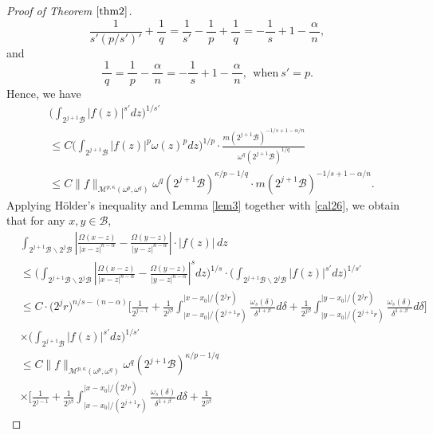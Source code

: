 \documentclass[preprint,10pt]{elsarticle}
\numberwithin{equation}{section}
\begin{document}
\begin{proof}[Proof of Theorem $\ref{thm2}$]
\begin{equation*}
\frac{1}{s'(p/{s'})'}+\frac{\,1\,}{q}=\frac{1}{s'}-\frac{\,1\,}{p}+\frac{\,1\,}{q}=-\frac{\,1\,}{s}+1-\frac{\alpha}{\,n\,},
\end{equation*}
and
\begin{equation*}
\frac{\,1\,}{q}=\frac{\,1\,}{p}-\frac{\alpha}{\,n\,}=-\frac{\,1\,}{s}+1-\frac{\alpha}{\,n\,},~~\mbox{when}~ s'=p.
\end{equation*}
Hence, we have
\begin{equation}\label{cal26}
\begin{split}
&\bigg(\int_{2^{j+1}\mathcal{B}}|f(z)|^{s'}dz\bigg)^{1/{s'}}\\
&\leq C\bigg(\int_{2^{j+1}\mathcal{B}}|f(z)|^{p}\omega(z)^{p}dz\bigg)^{1/p}
\cdot\frac{m(2^{j+1}\mathcal{B})^{-1/s+1-\alpha/n}}{\omega^q(2^{j+1}\mathcal{B})^{1/q}}  \\
&\leq C\|f\|_{\mathcal{M}^{p,\kappa}(\omega^p,\omega^q)}\omega^q(2^{j+1}\mathcal{B})^{\kappa/p-1/q}
\cdot m(2^{j+1}\mathcal{B})^{-1/s+1-\alpha/n}.
\end{split}
\end{equation}
Applying H\"{o}lder's inequality and Lemma \ref{lem3} together with \eqref{cal26}, we obtain that for any $x,y\in \mathcal{B}$,
\begin{equation*}
\begin{split}
&\int_{2^{j+1}\mathcal{B}\backslash 2^j\mathcal{B}}
\left|\frac{\Omega(x-z)}{|x-z|^{n-\alpha}}-\frac{\Omega(y-z)}{|y-z|^{n-\alpha}}\right|\cdot|f(z)|\,dz\\
&\leq\bigg(\int_{2^{j+1}\mathcal{B}\backslash 2^j\mathcal{B}}
\left|\frac{\Omega(x-z)}{|x-z|^{n-\alpha}}-\frac{\Omega(y-z)}{|y-z|^{n-\alpha}}\right|^sdz\bigg)^{1/s}
\cdot\bigg(\int_{2^{j+1}\mathcal{B}\backslash 2^j\mathcal{B}}|f(z)|^{s'}dz\bigg)^{1/{s'}}\\
&\leq C\cdot\big(2^jr\big)^{n/s-(n-\alpha)}
\bigg[\frac{1}{2^{j-1}}+\frac{1}{2^{j\beta}}
\int_{|x-x_0|/{(2^{j+1}r)}}^{|x-x_0|/{(2^jr)}}\frac{\omega_s(\delta)}{\delta^{1+\beta}}d\delta
+\frac{1}{2^{j\beta}}
\int_{|y-x_0|/{(2^{j+1}r)}}^{|y-x_0|/{(2^jr)}}\frac{\omega_s(\delta)}{\delta^{1+\beta}}d\delta\bigg]\\
&\times\bigg(\int_{2^{j+1}\mathcal{B}}|f(z)|^{s'}dz\bigg)^{1/{s'}}\\
&\leq C\|f\|_{\mathcal{M}^{p,\kappa}(\omega^p,\omega^q)}\omega^q(2^{j+1}\mathcal{B})^{\kappa/p-1/q}\\
&\times\bigg[\frac{1}{2^{j-1}}+\frac{1}{2^{j\beta}}
\int_{|x-x_0|/{(2^{j+1}r)}}^{|x-x_0|/{(2^jr)}}\frac{\omega_s(\delta)}{\delta^{1+\beta}}d\delta
+\frac{1}{2^{j\beta}}

\end{split}
\end{equation*}
\end{proof}
\end{document}
